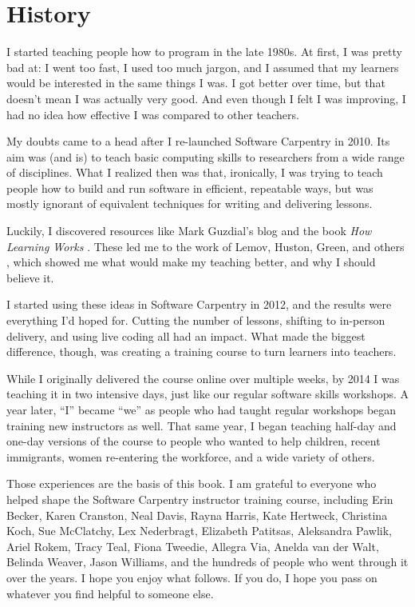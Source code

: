 \section*{History}

I started teaching people how to program in the late 1980s.  At first,
I was pretty bad at: I went too fast, I used too much jargon, and I
assumed that my learners would be interested in the same things I was.
I got better over time, but that doesn't mean I was actually very
good.  And even though I felt I was improving, I had no idea how
effective I was compared to other teachers.

My doubts came to a head after I re-launched Software Carpentry in
2010.  Its aim was (and is) to teach basic computing skills to
researchers from a wide range of disciplines.  What I realized then
was that, ironically, I was trying to teach people how to build and
run software in efficient, repeatable ways, but was mostly ignorant of
equivalent techniques for writing and delivering lessons.

Luckily, I discovered resources like Mark Guzdial's blog
\cite{bib:guzdial-blog} and the book \emph{How Learning
Works} \cite{bib:ambrose-hlw}.  These led me to the work of Lemov,
Huston, Green, and others
\cite{bib:lemov-champion,bib:huston-dont-know,bib:green-babt},
which showed me what would make my teaching better, and why I should
believe it.

I started using these ideas in Software Carpentry in 2012, and the
results were everything I'd hoped for.  Cutting the number of lessons,
shifting to in-person delivery, and using live coding all had an
impact.  What made the biggest difference, though, was creating a
training course to turn learners into teachers.

While I originally delivered the course online over multiple weeks, by
2014 I was teaching it in two intensive days, just like our regular
software skills workshops.  A year later, ``I'' became ``we'' as
people who had taught regular workshops began training new instructors
as well.  That same year, I began teaching half-day and one-day
versions of the course to people who wanted to help children, recent
immigrants, women re-entering the workforce, and a wide variety of
others.

Those experiences are the basis of this book.  I am grateful to
everyone who helped shape the Software Carpentry instructor training
course, including Erin Becker, Karen Cranston, Neal Davis, Rayna
Harris, Kate Hertweck, Christina Koch, Sue McClatchy, Lex Nederbragt,
Elizabeth Patitsas, Aleksandra Pawlik, Ariel Rokem, Tracy Teal, Fiona
Tweedie, Allegra Via, Anelda van der Walt, Belinda Weaver, Jason
Williams, and the hundreds of people who went through it over the
years.  I hope you enjoy what follows.  If you do, I hope you pass on
whatever you find helpful to someone else.

